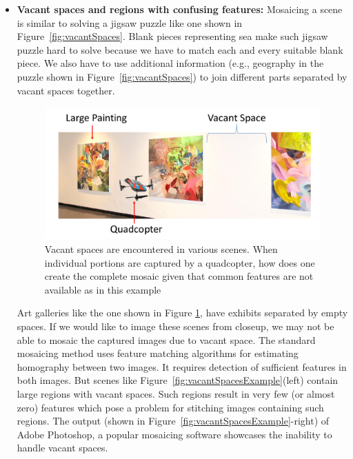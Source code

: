 \begin{itemize}
  \item \textbf{Vacant spaces and regions with confusing features:} 
  Mosaicing a scene is similar to solving a jigsaw puzzle like one shown in
  Figure~\ref{fig:vacantSpaces}. Blank pieces representing sea make such jigsaw
  puzzle hard to solve because we have to match each and every suitable blank
  piece. We also have to use additional information (e.g., geography in
  the puzzle shown in Figure~\ref{fig:vacantSpaces}) to join different parts
  separated by vacant spaces together.
  
\begin{figure}[h!]
\centering
\includegraphics[width=0.98\linewidth]{figures/vacantSpaces/indoor}
\caption[Vacant spaces problem in art gallery]{Vacant spaces are encountered in
various scenes.
When individual portions are captured by a quadcopter, how does one create the complete mosaic
    given that common features are not available as in this example}
\label{fig:indoor}
\end{figure}
  
  Art galleries like the one shown in Figure \ref{fig:indoor}, have exhibits
  separated by empty spaces. If we would like to image these scenes from closeup, we may not
  be able to mosaic the captured images due to vacant space. The standard
  mosaicing method uses feature matching algorithms for estimating homography
  between two images. It requires detection of sufficient features in both
  images. But scenes like Figure~\ref{fig:vacantSpacesExample}(left) contain
  large regions with vacant spaces. Such regions result in very few (or almost
  zero) features which pose a problem for stitching images containing such regions.
  The output (shown in Figure~\ref{fig:vacantSpacesExample}-right) of Adobe
  Photoshop, a popular mosaicing software showcases the inability to
  handle vacant spaces.
  

\end{itemize}
